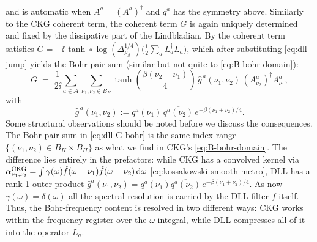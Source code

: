 and is automatic when $A^a = (A^a)^\dagger$ and $q^a$ has the symmetry above. Similarly to the CKG coherent term, the coherent term $G$ is again uniquely determined and fixed by the dissipative part of the Lindbladian. By \cite[Thm. 10]{ding2025efficient} the coherent term satisfies $G = -\ii\,\tanh\!\circ\!\log(\Delta_{\rho_\beta}^{1/4})\bigl(\tfrac{1}{2}\sum_a L_a^\dagger L_a\bigr)$, which after substituting \eqref{eq:dll-jump} yields the Bohr-pair sum (similar but not quite to \eqref{eq:B-bohr-domain}):
\begin{equation} \label{eq:dll-G-bohr}
    G \;=\; \frac{1}{2\ii}\sum_{a\in\mathcal{A}}\sum_{\nu_1,\nu_2 \in B_H}\tanh\!\left(\frac{\beta(\nu_2-\nu_1)}{4}\right)\, \widehat{g}^{\,a}(\nu_1,\nu_2)\,(A^a_{\nu_2})^\dagger A^a_{\nu_1},
\end{equation}
with 
$$
\widehat{g}^{\,a}(\nu_1,\nu_2) := q^a(\nu_1)\,\overline{q^a(\nu_2)}\,e^{-\beta(\nu_1+\nu_2)/4}.
$$
Some structural observations should be noted before we discuss the consequences. The Bohr-pair sum in \eqref{eq:dll-G-bohr} is the same index range $\{(\nu_1,\nu_2)\in B_H\times B_H\}$ as what we find in CKG's \eqref{eq:B-bohr-domain}. The difference lies entirely in the prefactors: while CKG has a convolved kernel via $\alpha_{\nu_1,\nu_2}^{\textup{CKG}} = \int \gamma(\omega)\hat{f}(\omega-\nu_1)\hat{f}(\omega-\nu_2)\mathop{}\!\mathrm{d}\omega$ \eqref{eq:kossakowski-smooth-metro}, DLL has a rank-1 outer product $\widehat{g}^a(\nu_1,\nu_2) = q^a(\nu_1)\overline{q^a(\nu_2)}\,e^{-\beta(\nu_1+\nu_2)/4}$. As now $\gamma(\omega) = \delta(\omega)$ all the spectral resolution is carried by the DLL filter $f$ itself. Thus, the Bohr-frequency content is resolved in two different ways: CKG works within the frequency register over the $\omega$-integral, while DLL compresses all of it into the operator $L_a$.

